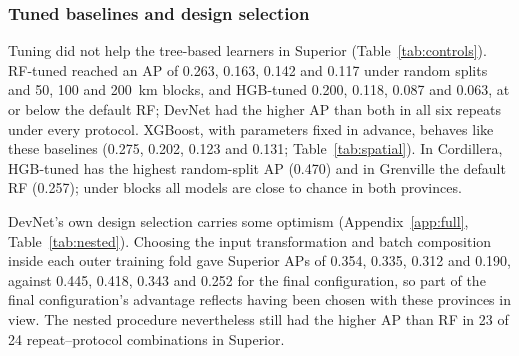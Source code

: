 \documentclass[pdflatex,sn-apa]{sn-jnl}
\begin{document}
\subsubsection{Tuned baselines and design selection}\label{sec:res-controls}

Tuning did not help the tree-based learners in Superior (Table~\ref{tab:controls}). RF-tuned reached an AP of 0.263, 0.163, 0.142 and 0.117 under random splits and 50, 100 and 200~km blocks, and HGB-tuned 0.200, 0.118, 0.087 and 0.063, at or below the default RF; DevNet had the higher AP than both in all six repeats under every protocol. XGBoost, with parameters fixed in advance, behaves like these baselines (0.275, 0.202, 0.123 and 0.131; Table~\ref{tab:spatial}). In Cordillera, HGB-tuned has the highest random-split AP (0.470) and in Grenville the default RF (0.257); under blocks all models are close to chance in both provinces.

DevNet's own design selection carries some optimism (Appendix~\ref{app:full}, Table~\ref{tab:nested}). Choosing the input transformation and batch composition inside each outer training fold gave Superior APs of 0.354, 0.335, 0.312 and 0.190, against 0.445, 0.418, 0.343 and 0.252 for the final configuration, so part of the final configuration's advantage reflects having been chosen with these provinces in view. The nested procedure nevertheless still had the higher AP than RF in 23 of 24 repeat--protocol combinations in Superior.
\end{document}
